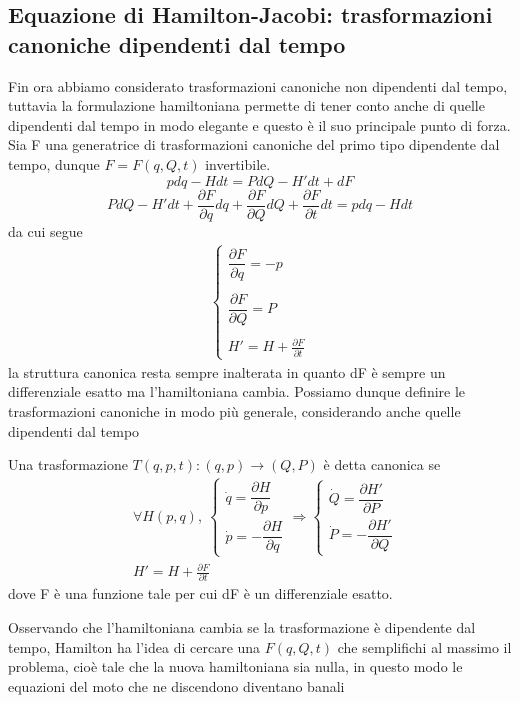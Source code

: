 \documentclass[
10pt, %
a4paper, %
oneside, %
headinclude,footinclude, %
BCOR5mm, %
]{scrartcl}
\begin{document}
\subsection{Equazione di Hamilton-Jacobi: trasformazioni canoniche dipendenti dal tempo}
Fin ora abbiamo considerato trasformazioni canoniche non dipendenti dal tempo, tuttavia la formulazione hamiltoniana permette di tener conto anche di quelle dipendenti dal tempo in modo elegante e questo è il suo principale punto di forza. Sia F una generatrice di trasformazioni canoniche del primo tipo dipendente dal tempo, dunque \(F = F(q, Q, t)\) invertibile. 
\[pdq-Hdt = PdQ-H'dt+dF\]
\[PdQ-H'dt+\frac{\partial F}{\partial q}dq+\frac{\partial F}{\partial Q}dQ+\frac{\partial F}{\partial t}dt = pdq-Hdt\]
da cui segue 
\begin{align*}
	\begin{cases}
		\dfrac{\partial F}{\partial q} = -p\\\\
		\dfrac{\partial F}{\partial Q} = P\\\\
		H' = H+\frac{\partial F}{\partial t}
	\end{cases}
\end{align*}
la struttura canonica resta sempre inalterata in quanto dF è sempre un differenziale esatto ma l'hamiltoniana cambia. Possiamo dunque definire le trasformazioni canoniche in modo più generale, considerando anche quelle dipendenti dal tempo
\begin{definizione}
	Una trasformazione \(T(q, p, t): (q, p)\rightarrow (Q, P)\) è detta canonica se
	\begin{align*}
		&\forall H(p, q),\ 
		\begin{cases}
			\dot{q} = \dfrac{\partial H}{\partial p}\\
			\dot{p} = -\dfrac{\partial H}{\partial q}
		\end{cases}\Rightarrow 
		\begin{cases}
			\dot{Q} = \dfrac{\partial H'}{\partial P}\\
			\dot{P} = -\dfrac{\partial H'}{\partial Q}
		\end{cases}\\
		& H' = H +\frac{\partial F}{\partial t}
	\end{align*}
	dove F è una funzione tale per cui dF è un differenziale esatto.
\end{definizione}
Osservando che l'hamiltoniana cambia se la trasformazione è dipendente dal tempo, Hamilton ha l'idea di cercare una \(F(q, Q, t)\) che semplifichi al massimo il problema, cioè tale che la nuova hamiltoniana sia nulla, in questo modo le equazioni del moto che ne discendono diventano banali
\end{document}

